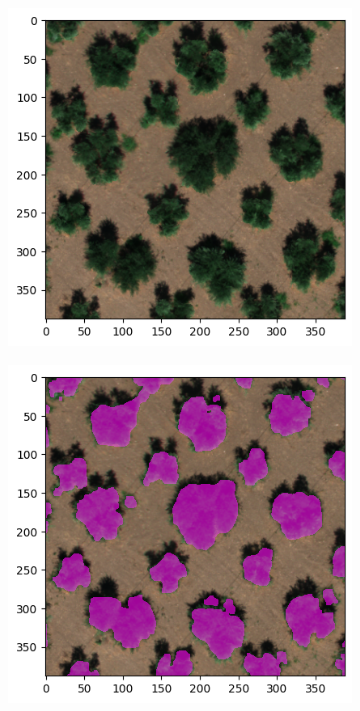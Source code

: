 \documentclass[comsoc,final]{IEEEtran}
\begin{document}
\begin{figure}
{\begin{subfigure}[b]{0.45\columnwidth}
         \caption{}
         \label{maskplot:c}
     \end{subfigure}}\\%
%       
     \begin{subfigure}[b]{0.45\columnwidth}
         \centering
         \includegraphics[width=\columnwidth]{ulivo}
         \caption{}
         \label{maskplot:input_tile2}
     \end{subfigure}%
%
     \begin{subfigure}[b]{0.45\columnwidth}
         \centering
         \includegraphics[width=\columnwidth]{ulivo_GT}

\end{subfigure}
\end{figure}
\end{document}
